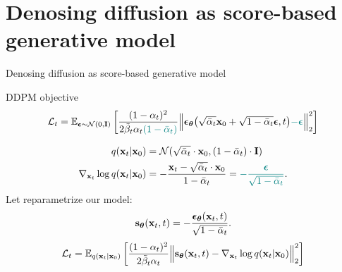 \section{Denosing diffusion as score-based generative model}
\begin{frame}{Denosing diffusion as score-based generative model}
	\begin{block}{DDPM objective}
		\vspace{-0.5cm}
		\[
			\mathcal{L}_t = \mathbb{E}_{\boldsymbol{\epsilon} \sim \mathcal{N}(0, \mathbf{I})} \left[ \frac{(1 - \alpha_t)^2}{2\tilde{\beta}_t \alpha_t  {\color{teal}(1 - \bar{\alpha}_t)}}  \Bigl\|  \boldsymbol{\epsilon}_{\boldsymbol{\theta}}\bigl( \sqrt{\bar{\alpha}_t} \mathbf{x}_0 + \sqrt{1 - \bar{\alpha}_t} \boldsymbol{\epsilon}, t\bigr) {\color{teal} - \boldsymbol{\epsilon}}\Bigr\|_2^2  \right]
		\]
		\vspace{-0.7cm}
	\end{block}
	\vspace{-0.5cm}
	\begin{align*}
		q(\mathbf{x}_t | \mathbf{x}_0) &= \mathcal{N}(\sqrt{\bar{\alpha}_t} \cdot \mathbf{x}_0, (1 - \bar{\alpha}_t) \cdot \mathbf{I}) \\
		\nabla_{\mathbf{x}_t} \log q(\mathbf{x}_t | \mathbf{x}_0) &= - \frac{\mathbf{x}_t - \sqrt{\bar{\alpha}_t} \cdot \mathbf{x}_0}{1 - \bar{\alpha}_t} = {\color{teal}-  \frac{\boldsymbol{\epsilon}}{\sqrt{1 - \bar{\alpha}_t}}}.
	\end{align*}
		Let reparametrize our model: 
		\vspace{-0.2cm}
		\[
			\mathbf{s}_{\boldsymbol{\theta}}(\mathbf{x}_t, t) = - \frac{\boldsymbol{\epsilon}_{\boldsymbol{\theta}}(\mathbf{x}_t, t)}{\sqrt{1 - \bar{\alpha}_t}}.
		\]
		\[
			\mathcal{L}_t = \mathbb{E}_{q(\mathbf{x}_t | \mathbf{x}_0)} \left[ \frac{(1 - \alpha_t)^2}{2\tilde{\beta}_t \alpha_t}  \Bigl\|  \mathbf{s}_{\boldsymbol{\theta}} (\mathbf{x}_t, t) - \nabla_{\mathbf{x}_t} \log q(\mathbf{x}_t | \mathbf{x}_0) \Bigr\|_2^2  \right]
		\]
	\end{frame}
